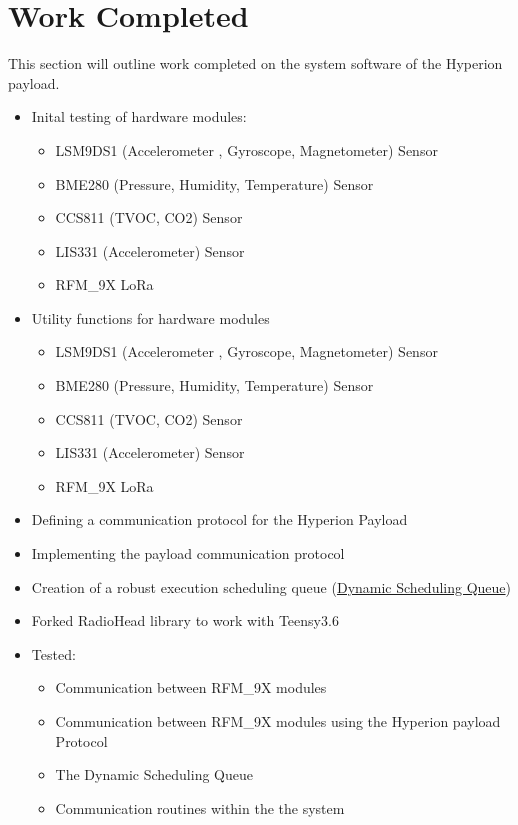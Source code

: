 \documentclass[11pt]{article}
\begin{document}
\maketitle

\section{Work Completed}
This section will outline work completed on the system software of the Hyperion payload. 
\begin{itemize}
  \item Inital testing of hardware modules:
  \begin{itemize}
  	\item LSM9DS1 (Accelerometer , Gyroscope, Magnetometer) Sensor
	\item BME280 (Pressure, Humidity, Temperature) Sensor
	\item CCS811 (TVOC, CO2) Sensor
	\item LIS331 (Accelerometer) Sensor
	\item RFM\_9X LoRa 
  \end{itemize}
  \item Utility functions for hardware modules
  \begin{itemize}
   	\item LSM9DS1 (Accelerometer , Gyroscope, Magnetometer) Sensor
	\item BME280 (Pressure, Humidity, Temperature) Sensor
	\item CCS811 (TVOC, CO2) Sensor
	\item LIS331 (Accelerometer) Sensor
	\item RFM\_9X LoRa 
  \end{itemize}
  \item Defining a communication protocol for the Hyperion Payload
  \item Implementing the payload communication protocol
  \item Creation of a robust execution scheduling queue (\href{https://github.com/RIT-Space-Exploration/Dynamic-Scheduling-Queue}{Dynamic Scheduling Queue})
  \item Forked RadioHead library to work with Teensy3.6
  \item Tested:
  \begin{itemize}
  	\item Communication between RFM\_9X modules 
	\item Communication between RFM\_9X modules using the Hyperion payload Protocol
	\item The Dynamic Scheduling Queue
	\item Communication routines within the the system
  \end{itemize}	
\end{itemize}
\end{document}
